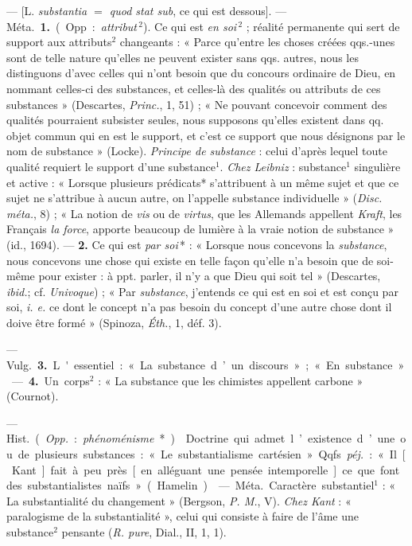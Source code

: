 \begin{itemize}[leftmargin=1cm, label=, itemsep=1pt]
 — [L. {\it substantia $=$ quod stat sub}, ce qui est dessous].
— \si{Méta.} {\bf 1.} (Opp. : {\it attribut}$\,^2$). Ce qui est {\it en soi}$\,^2$ ;
réalité permanente qui sert de support aux attributs$^2$ changeants : «
Parce qu’entre les choses créées qqs.-unes sont de telle nature qu’elles ne
peuvent exister sans qqs. autres, nous les distinguons d’avec celles qui
n’ont besoin que du concours ordinaire de Dieu, en nommant celles-ci des
substances, et celles-là des qualités ou attributs de ces substances
» (Descartes, {\it Princ.}, 1, 51) ; « Ne pouvant concevoir comment des
qualités pourraient subsister seules, nous supposons qu’elles existent dans
qq. objet commun qui en est le support, et c'est ce support que nous
désignons par le nom de substance » (Locke). {\it Principe de substance} :
celui d'après lequel toute qualité requiert le support d'une substance$^1$.
{\it Chez Leibniz} : substance$^1$ singulière et active : « Lorsque
plusieurs prédicats* s’attribuent à un même sujet et que ce sujet ne
s’attribue à aucun autre, on l’appelle substance individuelle » ({\it Disc.
méta.}, 8) ; « La notion de {\it vis} ou de {\it virtus}, que les Allemands
appellent {\it Kraft}, les Français {\it la force}, apporte beaucoup de
lumière à la vraie notion de substance » (id., 1694). — {\bf 2.} Ce qui est
{\it par soi}\,* : « Lorsque nous concevons la {\it substance}, nous concevons
une chose qui existe en telle façon qu’elle n’a besoin que de soi-même pour
exister : à ppt. parler, il n’y a que Dieu qui soit tel » (Descartes,
{\it ibid.}; cf. {\it Univoque}) ; « Par {\it substance}, j'entends ce qui
est en soi et est conçu par soi, {\it i. e.} ce dont le concept n'a pas
besoin du concept d’une autre chose dont il doive être formé » (Spinoza,
{\it Éth.}, 1, déf. 3).

— \si{Vulg.} {\bf 3.} L'essentiel : « La substance d’un discours » ; « En
substance ». — {\bf 4.} Un corps$^2$ : « La substance que les chimistes
appellent carbone » (Cournot).

 — \si{Hist.} ({\it Opp.} : {\it phénoménisme}*).
 Doctrine qui admet l’existence d’une ou de plusieurs
substances : « Le substantialisme cartésien ». Qqfs. {\it péj.} : « Il
[Kant] fait à peu près [en alléguant une pensée intemporelle] ce que font
des substantialistes naïfs » (Hamelin).

 — \si{Méta.} Caractère substantiel$^1$ : « La
substantialité du changement » (Bergson, {\it P. M.}, V). {\it Chez Kant} :
« paralogisme de la substantialité », celui qui consiste à faire de l'âme
une substance$^2$ pensante ({\it R. pure}, Dial., II, 1, 1).


\end{itemize}
